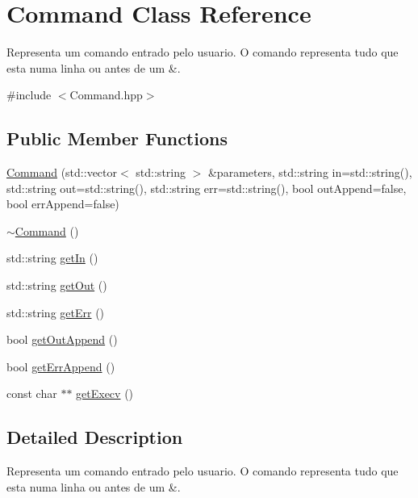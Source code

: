 \hypertarget{classCommand}{
\section{Command Class Reference}
\label{classCommand}
}


Representa um comando entrado pelo usuario. O comando representa tudo que esta numa linha ou antes de um \&.  




{\ttfamily \#include $<$Command.hpp$>$}

\subsection*{Public Member Functions}
\begin{DoxyCompactItemize}
\item 
\hyperlink{classCommand_a649b404d34720e098d6e0de6b07ad0c1}{Command} (std::vector$<$ std::string $>$ \&parameters, std::string in=std::string(), std::string out=std::string(), std::string err=std::string(), bool outAppend=false, bool errAppend=false)
\item 
\hyperlink{classCommand_ab552bb3a07fdd1acbfd8ea76e69b2278}{$\sim$Command} ()
\item 
std::string \hyperlink{classCommand_a660ad6733da715bcd5f74a38c04f4527}{getIn} ()
\item 
std::string \hyperlink{classCommand_a63ab07191770dd7f8133e49f8c4552d6}{getOut} ()
\item 
std::string \hyperlink{classCommand_a0421ff1ec0e2aec12fe8a334ceaea3ef}{getErr} ()
\item 
bool \hyperlink{classCommand_a054da0acd3b09e33c40df6865fc29c55}{getOutAppend} ()
\item 
bool \hyperlink{classCommand_a59a9ec8f011e3467e36ad72a8bcd3129}{getErrAppend} ()
\item 
const char $\ast$$\ast$ \hyperlink{classCommand_a37ef9c4ef69e9de78c138b0fe6b98f9f}{getExecv} ()
\end{DoxyCompactItemize}


\subsection{Detailed Description}
Representa um comando entrado pelo usuario. O comando representa tudo que esta numa linha ou antes de um \&. 

